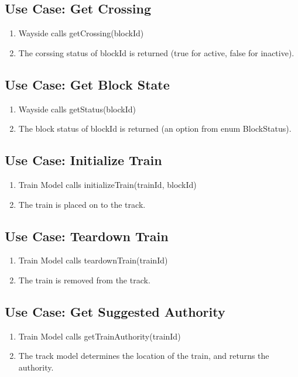 \documentclass{scrreprt}
\begin{document}
\subsection{Use Case: Get Crossing}
\begin{enumerate}
	\item Wayside calls getCrossing(blockId)
	\item The corssing status of blockId is returned (true for active, false for inactive).
\end{enumerate}

\subsection{Use Case: Get Block State}
\begin{enumerate}
	\item Wayside calls getStatus(blockId)
	\item The block status of blockId is returned (an option from enum BlockStatus).
\end{enumerate}

\subsection{Use Case: Initialize Train}
\begin{enumerate}
	\item Train Model calls initializeTrain(trainId, blockId)
	\item The train is placed on to the track.
\end{enumerate}

\subsection{Use Case: Teardown Train}
\begin{enumerate}
	\item Train Model calls teardownTrain(trainId)
	\item The train is removed from the track.
\end{enumerate}

\subsection{Use Case: Get Suggested Authority}
\begin{enumerate}
	\item Train Model calls getTrainAuthority(trainId)
	\item The track model determines the location of the train, and returns the authority.
\end{enumerate}
\end{document}
